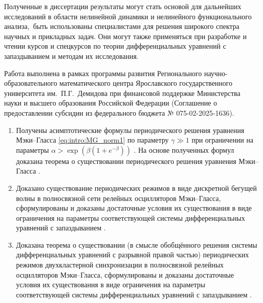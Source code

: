 Полученные в диссертации результаты могут стать основой для дальнейших исследований в области нелинейной динамики и нелинейного функционального анализа, быть использованы специалистами для решения широкого спектра научных и прикладных задач. Они могут также применяться при разработке и чтении курсов и спецкурсов по теории дифференциальных уравнений с запаздыванием и методам их исследования.

Работа выполнена в рамках программы развития Регионального научно-образовательного математического центра Ярославского государственного университета им.~П.Г.~Демидова при финансовой поддержке Министерства науки и высшего образования Российской Федерации (Соглашение о предоставлении субсидии из федерального бюджета № 075-02-2025-1636).

\bigskip

{}
\begin{enumerate}[beginpenalty=10000] %
	\item Получены асимптотические формулы периодического решения уравнения Мэки--Гласса \eqref{eq:intro:MG_norm1} по параметру $\gamma \gg 1$ при ограничении на параметры $\alpha > \exp\left(\beta(1 + e^{-\beta})\right)$ \cite[Теорема~5.6]{wosbib1}. На основе полученных формул доказана теорема о существовании периодического решения уравнения Мэки--Гласса \cite[Теорема~3.2]{wosbib1}.
	\item Доказано существование периодических режимов в виде дискретной бегущей волны в полносвязной сети релейных осцилляторов Мэки--Гласса, сформулированы и доказаны достаточные условия их существования в виде ограничения на параметры соответствующей системы дифференциальных уравнений с запаздыванием \cite[Теорема~16]{wosbib2}.
	\item Доказана теорема о существовании (в смысле обобщённого решения системы дифференциальных уравнений с разрывной правой частью) периодических режимов двухкластерной синхронизации в полносвязной  релейных осцилляторов Мэки--Гласса, сформулированы и доказаны достаточные условия их существования в виде ограничения на параметры соответствующей системы дифференциальных уравнений с запаздыванием \cite[Теорема~5.2]{scbib1}.
\end{enumerate}

\bigskip

